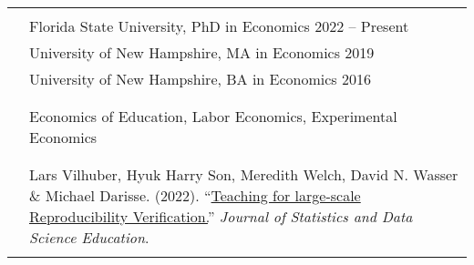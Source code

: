\documentclass[letterpaper, 11pt]{article}
\begin{document}
\begin{longtable}{p{0.1in}p{5.9in}}


\color{Maroon}{EDUCATION} \\
& Florida State University, PhD in Economics  \hfill 2022 -- Present \\
& University of New Hampshire, MA in Economics \hfill 2019 \\
& University of New Hampshire, BA in Economics  \hfill 2016 \\ & \\


\multicolumn{2}{l}{\nohyphens{\color{Maroon}{RESEARCH INTERESTS}}} \\
& Economics of Education, Labor Economics, Experimental Economics \\
& \\




\multicolumn{2}{l}{\nohyphens{\color{Maroon}{PUBLICATIONS}}}\\

& Lars Vilhuber, Hyuk Harry Son, Meredith Welch, David N. Wasser \& Michael Darisse. (2022). ``\href{https://www.tandfonline.com/doi/full/10.1080/26939169.2022.2074582}{Teaching for large-scale Reproducibility Verification.}'' \textit{Journal of Statistics and Data Science Education}. \\ & \\


\end{longtable}
\end{document}
